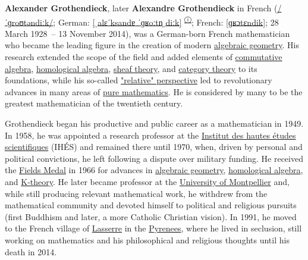 \textbf{Alexander Grothendieck}, later \textbf{Alexandre Grothendieck} in French ({\foreignlanguage{english}{\href{https://en.wikipedia.org/wiki/Help:IPA/English}{/{{ˈ}{ɡ}{r}{oʊ}{t}{ən}{d}{iː}{k}}/}}}; {German:}{ }\foreignlanguage{ngerman}{\href{https://en.wikipedia.org/wiki/Help:IPA/Standard_German}{{{[}}ˌalɛˈksandɐ{ }ˈɡʁoːtn̩ˌdiːk{{]}}}}{ }{{}\textsuperscript{\href{https://en.wikipedia.org/wiki/File:De-Alexander_Grothendieck.ogg}{ⓘ}}}; {French:}{ }\foreignlanguage{french}{\href{https://en.wikipedia.org/wiki/Help:IPA/French}{{{[}}ɡʁɔtɛndik{{]}}}}; 28 March 1928{~}-- 13 November 2014), was a German-born French mathematician who became the leading figure in the creation of modern \href{https://en.wikipedia.org/wiki/Algebraic_geometry}{algebraic geometry}. His research extended the scope of the field and added elements of \href{https://en.wikipedia.org/wiki/Commutative_algebra}{commutative algebra}, \href{https://en.wikipedia.org/wiki/Homological_algebra}{homological algebra}, \href{https://en.wikipedia.org/wiki/Sheaf_theory}{sheaf theory}, and \href{https://en.wikipedia.org/wiki/Category_theory}{category theory} to its foundations, while his so-called \href{https://en.wikipedia.org/wiki/Grothendieck's_relative_point_of_view}{"relative" perspective} led to revolutionary advances in many areas of \href{https://en.wikipedia.org/wiki/Pure_mathematics}{pure mathematics}. He is considered by many to be the greatest mathematician of the twentieth century.

Grothendieck began his productive and public career as a mathematician in 1949. In 1958, he was appointed a research professor at the \href{https://en.wikipedia.org/wiki/Institut_des_Hautes_Études_Scientifiques}{Institut des hautes études scientifiques} (IHÉS) and remained there until 1970, when, driven by personal and political convictions, he left following a dispute over military funding. He received the \href{https://en.wikipedia.org/wiki/Fields_Medal}{Fields Medal} in 1966 for advances in \href{https://en.wikipedia.org/wiki/Algebraic_geometry}{algebraic geometry}, \href{https://en.wikipedia.org/wiki/Homological_algebra}{homological algebra}, and \href{https://en.wikipedia.org/wiki/K-theory}{K-theory}. He later became professor at the \href{https://en.wikipedia.org/wiki/University_of_Montpellier}{University of Montpellier} and, while still producing relevant mathematical work, he withdrew from the mathematical community and devoted himself to political and religious pursuits (first Buddhism and later, a more Catholic Christian vision). In 1991, he moved to the French village of \href{https://en.wikipedia.org/wiki/Lasserre,_Ariège}{Lasserre} in the \href{https://en.wikipedia.org/wiki/Pyrenees}{Pyrenees}, where he lived in seclusion, still working on mathematics and his philosophical and religious thoughts until his death in 2014.


